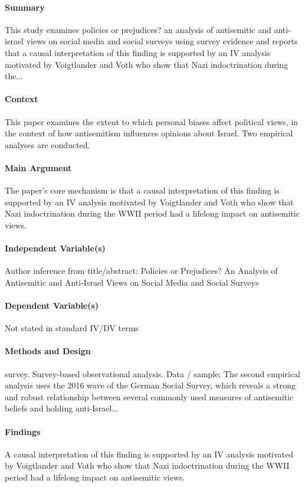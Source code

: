 \documentclass[12pt]{article}
\begin{document}
\paragraph{Summary} This study examines policies or prejudices? an analysis of antisemitic and anti-israel views on social media and social surveys using survey evidence and reports that a causal interpretation of this finding is supported by an IV analysis motivated by Voigtlander and Voth who show that Nazi indoctrination during the...

\paragraph{Context} This paper examines the extent to which personal biases affect political views, in the context of how antisemitism influences opinions about Israel. Two empirical analyses are conducted.

\paragraph{Main Argument} The paper's core mechanism is that a causal interpretation of this finding is supported by an IV analysis motivated by Voigtlander and Voth who show that Nazi indoctrination during the WWII period had a lifelong impact on antisemitic views.

\paragraph{Independent Variable(s)} Author inference from title/abstract: Policies or Prejudices? An Analysis of Antisemitic and Anti-Israel Views on Social Media and Social Surveys

\paragraph{Dependent Variable(s)} Not stated in standard IV/DV terms

\paragraph{Methods and Design} survey. Survey-based observational analysis. Data / sample: The second empirical analysis uses the 2016 wave of the German Social Survey, which reveals a strong and robust relationship between several commonly used measures of antisemitic beliefs and holding anti-Israel...

\paragraph{Findings} A causal interpretation of this finding is supported by an IV analysis motivated by Voigtlander and Voth who show that Nazi indoctrination during the WWII period had a lifelong impact on antisemitic views.
\end{document}
